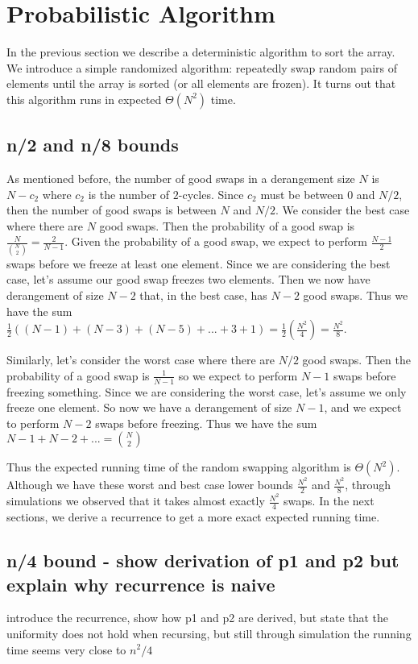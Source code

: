 \documentclass{article}
\begin{document}
\section{Probabilistic Algorithm}
In the previous section we describe a deterministic algorithm to sort the array. We introduce
a simple randomized algorithm: repeatedly swap random pairs of elements until the array is sorted
(or all elements are frozen). It turns out that this algorithm runs in expected $\Theta(N^2)$
time. 

\subsection{n/2 and n/8 bounds}
As mentioned before, the number of good swaps in a derangement size $N$ 
is $N - c_2$ where $c_2$ is the number
of $2$-cycles. Since $c_2$ must be between $0$ and $N/2$, then the number of good swaps
is between $N$ and $N/2$. We consider the best case where there are $N$ good swaps.
Then the probability of a good swap is $\frac{N}{{N \choose 2}} = \frac{2}{N - 1}$.
Given the probability of a good swap, we expect to perform $\frac{N - 1}{2}$ swaps before we 
freeze at least one element. Since we are considering the best case, let's assume our
good swap freezes two elements. Then we now have derangement of size $N - 2$ that, in the best
case, has $N - 2$ good swaps. Thus we have the sum
$\frac{1}{2}((N - 1) + (N - 3) + (N - 5) + ... + 3 + 1) = \frac{1}{2}(\frac{N^2}{4}) = \frac{N^2}{8} $.

Similarly, let's consider the worst case where there are $N/2$ good swaps. Then the probability
of a good swap is $\frac{1}{N - 1}$ so we expect to perform $N - 1$ swaps before freezing
something. Since we are considering the worst case, let's assume we only freeze one element.
So now we have a derangement of size $N - 1$, and we expect to perform $N - 2$ swaps before
freezing. Thus we have the sum
$ N - 1 + N - 2 + ... = {N \choose 2} $

Thus the expected running time of the random swapping algorithm is $\Theta(N^2)$.
Although we have these worst and best case lower bounds $\frac{N^2}{2}$ and $\frac{N^2}{8}$,
through simulations we observed that it takes almost exactly $\frac{N^2}{4}$ swaps.
In the next sections, we derive a recurrence to get a more exact expected running time.

\subsection{n/4 bound - show derivation of p1 and p2 but explain why recurrence is naive}
introduce the recurrence, show how p1 and p2 are derived, but state that the uniformity
does not hold when recursing, but still through simulation the running time seems very close to $n^2/4$
\end{document}

